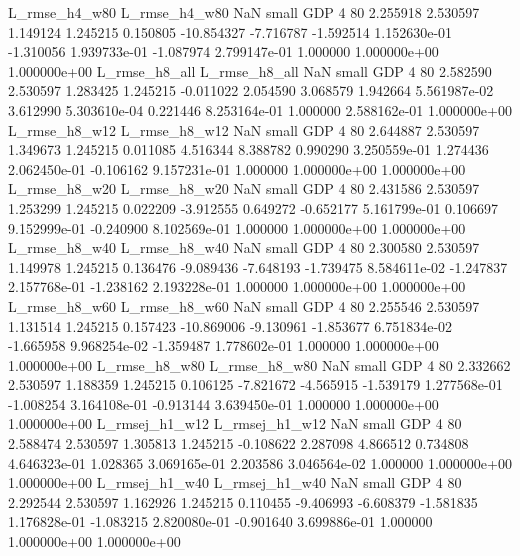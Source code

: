  L_rmse_h4_w80  L_rmse_h4_w80                   NaN      small      GDP                 4 80 2.255918       2.530597 1.149124       1.245215    0.150805    -10.854327     -7.716787    -1.592514   1.152630e-01 -1.310056 1.939733e-01    -1.087974   2.799147e-01            1.000000    1.000000e+00        1.000000e+00
 L_rmse_h8_all  L_rmse_h8_all                   NaN      small      GDP                 4 80 2.582590       2.530597 1.283425       1.245215   -0.011022      2.054590      3.068579     1.942664   5.561987e-02  3.612990 5.303610e-04     0.221446   8.253164e-01            1.000000    2.588162e-01        1.000000e+00
 L_rmse_h8_w12  L_rmse_h8_w12                   NaN      small      GDP                 4 80 2.644887       2.530597 1.349673       1.245215    0.011085      4.516344      8.388782     0.990290   3.250559e-01  1.274436 2.062450e-01    -0.106162   9.157231e-01            1.000000    1.000000e+00        1.000000e+00
 L_rmse_h8_w20  L_rmse_h8_w20                   NaN      small      GDP                 4 80 2.431586       2.530597 1.253299       1.245215    0.022209     -3.912555      0.649272    -0.652177   5.161799e-01  0.106697 9.152999e-01    -0.240900   8.102569e-01            1.000000    1.000000e+00        1.000000e+00
 L_rmse_h8_w40  L_rmse_h8_w40                   NaN      small      GDP                 4 80 2.300580       2.530597 1.149978       1.245215    0.136476     -9.089436     -7.648193    -1.739475   8.584611e-02 -1.247837 2.157768e-01    -1.238162   2.193228e-01            1.000000    1.000000e+00        1.000000e+00
 L_rmse_h8_w60  L_rmse_h8_w60                   NaN      small      GDP                 4 80 2.255546       2.530597 1.131514       1.245215    0.157423    -10.869006     -9.130961    -1.853677   6.751834e-02 -1.665958 9.968254e-02    -1.359487   1.778602e-01            1.000000    1.000000e+00        1.000000e+00
 L_rmse_h8_w80  L_rmse_h8_w80                   NaN      small      GDP                 4 80 2.332662       2.530597 1.188359       1.245215    0.106125     -7.821672     -4.565915    -1.539179   1.277568e-01 -1.008254 3.164108e-01    -0.913144   3.639450e-01            1.000000    1.000000e+00        1.000000e+00
L_rmsej_h1_w12 L_rmsej_h1_w12                   NaN      small      GDP                 4 80 2.588474       2.530597 1.305813       1.245215   -0.108622      2.287098      4.866512     0.734808   4.646323e-01  1.028365 3.069165e-01     2.203586   3.046564e-02            1.000000    1.000000e+00        1.000000e+00
L_rmsej_h1_w40 L_rmsej_h1_w40                   NaN      small      GDP                 4 80 2.292544       2.530597 1.162926       1.245215    0.110455     -9.406993     -6.608379    -1.581835   1.176828e-01 -1.083215 2.820080e-01    -0.901640   3.699886e-01            1.000000    1.000000e+00        1.000000e+00
